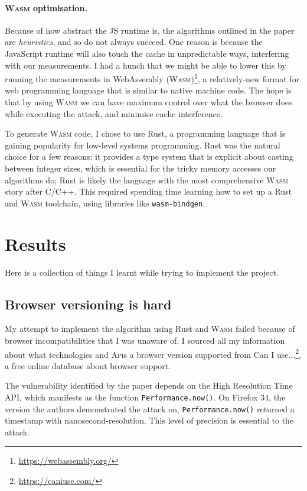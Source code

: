 \documentclass[a4paper,10pt,twocolumn]{article}
\theoremstyle{definition}
\newcommand*{\code}{\texttt}
\newcommand*{\acronym}{\textsc}
\newcommand*{\API}{\acronym{Api}}
\newcommand*{\WASM}{\acronym{Wasm}}
\begin{document}
\paragraph{\WASM{} optimisation.}
Because of how abstract the JS runtime is, the algorithms outlined in
the paper are \emph{heuristics}, and so do not always succeed.
One reason is because the JavaScript runtime will also
touch the cache in unpredictable ways, interfering with our measurements.
I had a hunch that we might be able to lower this by running the measurements in
WebAssembly (\WASM{})\footnote{\url{https://webassembly.org/}}, a relatively-new
format for web programming language that is similar to native machine code.
The hope is that by using \WASM{} we can have maximum control over what the browser
does while executing the attack, and minimise cache interference.

To generate \WASM{} code, I chose to use Rust, a programming language that is
gaining popularity for low-level systems programming.
Rust was the natural choice for a few reasons:
it provides a type system that is explicit about casting between
integer sizes, which is essential for the tricky memory accesses our algorithms
do;
Rust is likely the language with the most comprehensive \WASM{} story after C/C++.
This required spending time learning how to set up a Rust and \WASM{} toolchain,
using libraries like \code{wasm-bindgen}.

\section{Results}

Here is a collection of things I learnt while trying to implement the project.

\subsection{Browser versioning is hard}

My attempt to implement the algorithm using Rust and \WASM{} failed because of
browser incompatibilities that I was unaware of.
I sourced all my information about what technologies and \API{}s a browser
version supported from Can I use...\footnote{\url{https://caniuse.com/}}, a free
online database about browser support.

The vulnerability identified by the paper depends on the High Resolution Time
API, which manifests as the function \code{Performance.now()}.
On Firefox 34, the version the authors demonstrated the attack on,
\code{Performance.now()} returned a timestamp with nanosecond-resolution.
This level of precision is essential to the attack.
\end{document}
